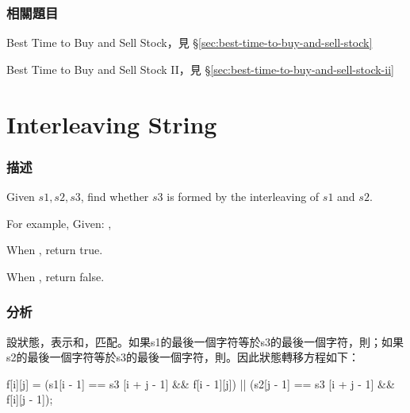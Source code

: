 \subsubsection{相關題目}
\begindot
\item Best Time to Buy and Sell Stock，見 \S \ref{sec:best-time-to-buy-and-sell-stock}
\item Best Time to Buy and Sell Stock II，見 \S \ref{sec:best-time-to-buy-and-sell-stock-ii}
\myenddot


\section{Interleaving String} %
\label{sec:interleaving-string}


\subsubsection{描述}
Given $s1, s2, s3$, find whether $s3$ is formed by the interleaving of $s1$ and $s2$.

For example, Given: ,

When , return true.

When , return false.


\subsubsection{分析}
設狀態，表示和，匹配。如果s1的最後一個字符等於s3的最後一個字符，則；如果s2的最後一個字符等於s3的最後一個字符，則。因此狀態轉移方程如下：
\begin{Code}
f[i][j] = (s1[i - 1] == s3 [i + j - 1] && f[i - 1][j])
       || (s2[j - 1] == s3 [i + j - 1] && f[i][j - 1]);
\end{Code}


